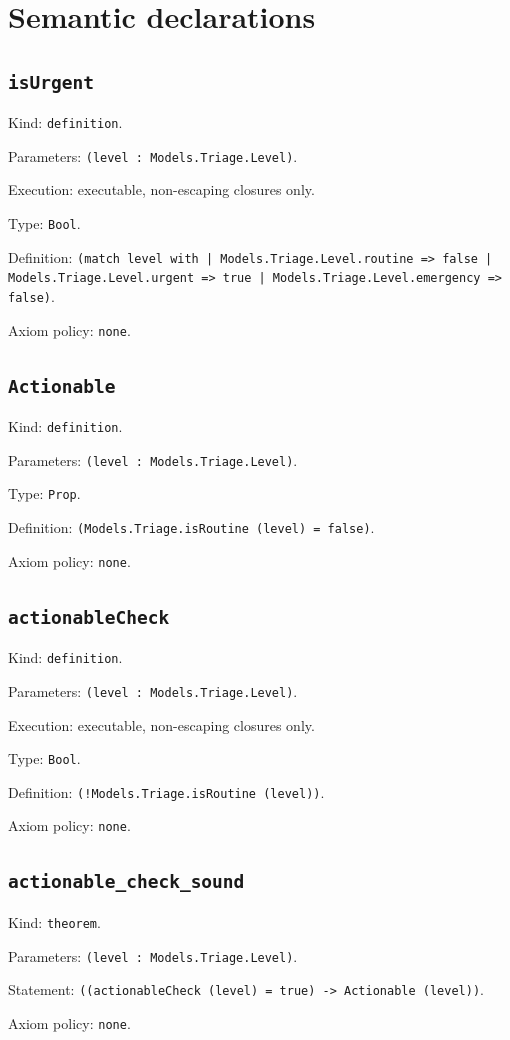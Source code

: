 \documentclass[11pt]{article}
\begin{document}
\section*{Semantic declarations}
\subsection*{\texttt{isUrgent}}
\noindent Kind: \texttt{definition}.\par
\noindent Parameters: \texttt{(level : Models.Triage.Level)}.\par
\noindent Execution: executable, non-escaping closures only.\par
\noindent Type: \texttt{Bool}.\par
\noindent Definition: \texttt{(match level with | Models.Triage.Level.routine => false | Models.Triage.Level.urgent => true | Models.Triage.Level.emergency => false)}.\par
\noindent Axiom policy: \texttt{none}.\par
\subsection*{\texttt{Actionable}}
\noindent Kind: \texttt{definition}.\par
\noindent Parameters: \texttt{(level : Models.Triage.Level)}.\par
\noindent Type: \texttt{Prop}.\par
\noindent Definition: \texttt{(Models.Triage.isRoutine (level) = false)}.\par
\noindent Axiom policy: \texttt{none}.\par
\subsection*{\texttt{actionableCheck}}
\noindent Kind: \texttt{definition}.\par
\noindent Parameters: \texttt{(level : Models.Triage.Level)}.\par
\noindent Execution: executable, non-escaping closures only.\par
\noindent Type: \texttt{Bool}.\par
\noindent Definition: \texttt{(!Models.Triage.isRoutine (level))}.\par
\noindent Axiom policy: \texttt{none}.\par
\subsection*{\texttt{actionable\_check\_sound}}
\noindent Kind: \texttt{theorem}.\par
\noindent Parameters: \texttt{(level : Models.Triage.Level)}.\par
\noindent Statement: \texttt{((actionableCheck (level) = true) -> Actionable (level))}.\par
\noindent Axiom policy: \texttt{none}.\par
\end{document}
